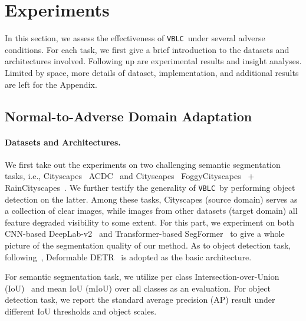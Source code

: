 \documentclass[letterpaper]{article} \usepackage{aaai23}  \usepackage{times}  \usepackage{helvet}  \usepackage{courier}  \usepackage[hyphens]{url}  \usepackage{graphicx} \urlstyle{rm} \def\UrlFont{\rm}  \usepackage{natbib}  \usepackage{caption} \frenchspacing  \setlength{\pdfpagewidth}{8.5in}  \setlength{\pdfpageheight}{11in}  \usepackage{algorithm}
\newcommand{\method}{\texttt{VBLC}~}
\begin{document}
\section{Experiments}\label{sec:Experiments}

In this section, we assess the effectiveness of \method under several adverse conditions. For each task, we first give a brief introduction to the datasets and architectures involved. Following up are experimental results and insight analyses. Limited by space, more details of dataset, implementation, and additional results are left for the Appendix.

\subsection{Normal-to-Adverse Domain Adaptation}

\paragraph{Datasets and Architectures.} We first take out the experiments on two challenging semantic segmentation tasks, i.e., Cityscapes~\cite{cordts2016cityscapes}  ACDC~\cite{sakaridis2021acdc} and Cityscapes~\cite{cordts2016cityscapes}  FoggyCityscapes~\cite{sakaridis2018semantic} + RainCityscapes~\cite{hu2019depth}. We further testify the generality of \method by performing object detection on the latter. Among these tasks, Cityscapes (source domain) serves as a collection of clear images, while images from other datasets (target domain) all feature degraded visibility to some extent. For this part, we experiment on both CNN-based DeepLab-v2~\cite{chen2017deeplab} and Transformer-based SegFormer~\cite{xie2021segformer} to give a whole picture of the segmentation quality of our method. As to object detection task, following~\citet{Wang2021SFA}, Deformable DETR~\cite{DeformableDETR} is adopted as the basic architecture.

For semantic segmentation task, we utilize per class Intersection-over-Union (IoU)~\cite{everingham2015IoU} and mean IoU (mIoU) over all classes as an evaluation. For object detection task, we report the standard average precision (AP) result under different IoU thresholds and object scales.
\end{document}
